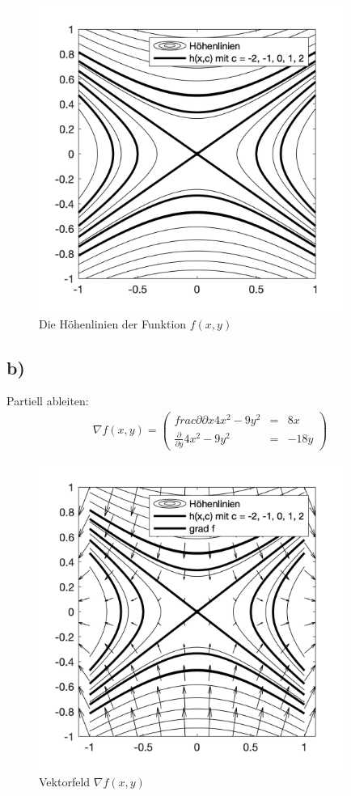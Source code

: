 \documentclass[11pt,a4paper]{article}
\newcommand{\1}    	{\mathbbm{1}}
\begin{document}
	\begin{figure}[!h]
  	\centering
 	\includegraphics[width=10cm]{Blatt01_4a.png}
  	\caption{Die Höhenlinien der Funktion \(f(x,y)\) }
	\end{figure}
	
	\subsection*{b)}
	
	Partiell ableiten:
	\begin{align*}
		\nabla f(x,y) = \left( \begin{array}{ccc}
			frac{\partial}{\partial x} 4x^2 - 9y^2 & = & 8x \\
			\frac{\partial}{\partial y}  4x^2 - 9y^2 & = & -18y
		\end{array} \right)
	\end{align*}
	
	\begin{figure}[!h]
  	\centering
 	\includegraphics[width=10cm]{Blatt01_4b.png}
  	\caption{Vektorfeld \(\nabla f(x,y)\) }
	\end{figure}
	
	
\end{document}
